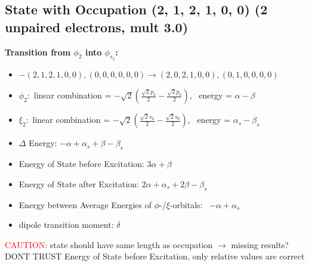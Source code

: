 \documentclass[12pt,a4paper]{article}
\begin{document}
\subsection*{State with Occupation (2, 1, 2, 1, 0, 0) (2 unpaired electrons, mult 3.0)}
        \noindent\textbf{Transition from $\phi_{2}$ into $\phi_{s_{2}}$:}
        \begin{itemize}
            \item $- (2, 1, 2, 1, 0, 0), (0, 0, 0, 0, 0, 0) \rightarrow (2, 0, 2, 1, 0, 0), (0, 1, 0, 0, 0, 0)$
        
            \item $\phi_{2}:$ linear combination = $- \sqrt{2} \left(\frac{\sqrt{2} p_{2}}{2} - \frac{\sqrt{2} p_{6}}{2}\right)$, \
            energy = $\alpha - \beta$
            
            \item $\xi_{2}:$ linear combination = $- \sqrt{2} \left(\frac{\sqrt{2} s_{2}}{2} - \frac{\sqrt{2} s_{6}}{2}\right)$, \
            energy = $\alpha_{s} - \beta_{s}$
            
            \item $\Delta$ Energy: $- \alpha + \alpha_{s} + \beta - \beta_{s}$
            \item Energy of State before Excitation: $3 \alpha + \beta$
            \item Energy of State after Excitation: $2 \alpha + \alpha_{s} + 2 \beta - \beta_{s}$
            \item Energy between Average Energies of $\phi$-/$\xi$-orbitals: \
            $- \alpha + \alpha_{s}$
        
            \item dipole transition moment: $\delta$
        
        \end{itemize}
        
	\textcolor{red}{CAUTION:} state should have same length as occupation $\rightarrow$ missing results?
	DONT TRUST \glqq{}Energy of State before Excitation\grqq{}, only relative values are correct
\end{document}
